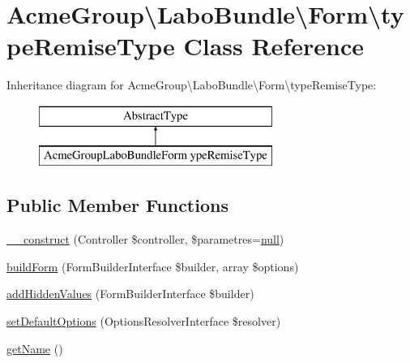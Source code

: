 \hypertarget{class_acme_group_1_1_labo_bundle_1_1_form_1_1type_remise_type}{\section{Acme\+Group\textbackslash{}Labo\+Bundle\textbackslash{}Form\textbackslash{}type\+Remise\+Type Class Reference}
\label{class_acme_group_1_1_labo_bundle_1_1_form_1_1type_remise_type}
}
Inheritance diagram for Acme\+Group\textbackslash{}Labo\+Bundle\textbackslash{}Form\textbackslash{}type\+Remise\+Type\+:\begin{figure}[H]
\begin{center}
\leavevmode
\includegraphics[height=2.000000cm]{class_acme_group_1_1_labo_bundle_1_1_form_1_1type_remise_type}
\end{center}
\end{figure}
\subsection*{Public Member Functions}
\begin{DoxyCompactItemize}
\item 
\hyperlink{class_acme_group_1_1_labo_bundle_1_1_form_1_1type_remise_type_ad250680105c88354889164dacde15419}{\+\_\+\+\_\+construct} (Controller \$controller, \$parametres=\hyperlink{validate_8js_afb8e110345c45e74478894341ab6b28e}{null})
\item 
\hyperlink{class_acme_group_1_1_labo_bundle_1_1_form_1_1type_remise_type_a91858c3a0b46bdd680bfa25f01bbf147}{build\+Form} (Form\+Builder\+Interface \$builder, array \$options)
\item 
\hyperlink{class_acme_group_1_1_labo_bundle_1_1_form_1_1type_remise_type_a45ae4367f0ad337edfa1a35da65fc23e}{add\+Hidden\+Values} (Form\+Builder\+Interface \$builder)
\item 
\hyperlink{class_acme_group_1_1_labo_bundle_1_1_form_1_1type_remise_type_a8e6de2f1b43ef28f1eaeaf8510f4c49e}{set\+Default\+Options} (Options\+Resolver\+Interface \$resolver)
\item 
\hyperlink{class_acme_group_1_1_labo_bundle_1_1_form_1_1type_remise_type_aa000f3a255d22f46800eea386ef0e1ab}{get\+Name} ()
\end{DoxyCompactItemize}


